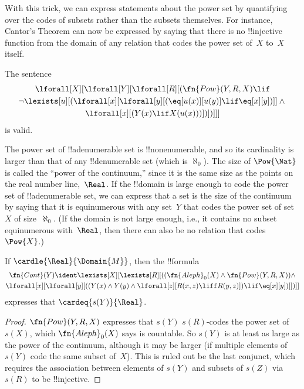 \documentclass[../../../include/open-logic-section]{subfiles}
\begin{document}
\begin{explain}
With this trick, we can express statements about the power set by
quantifying over the codes of subsets rather than the subsets
themselves.  For instance, Cantor's Theorem can now be expressed
by saying that there is no !!{injective} function from the domain
of any relation that codes the power set of~$X$ to~$X$ itself.
\end{explain}

\begin{prop}
The sentence
\begin{multline*}
  \lforall[X][\lforall[Y][\lforall[R][(\fn{Pow}(Y, R, X) \lif \\
      \lnot \lexists[u][(\lforall[x][\lforall[y][(\eq[u(x)][u(y)] \lif
            \eq[x][y])]] \land {}\\
        \lforall[x][(Y(x) \lif X(u(x)))])])]]]
\end{multline*}
is valid.
\end{prop}

\begin{explain}
The power set of !!a{denumerable} set is !!{nonenumerable}, and so its
cardinality is larger than that of any !!{denumerable} set (which is
$\aleph_0$).  The size of $\Pow{\Nat}$ is called the ``power of the
continuum,'' since it is the same size as the points on the real
number line,~$\Real$. If the !!{domain} is large enough to code the
power set of !!a{denumerable} set, we can express that a set is the
size of the continuum by saying that it is equinumerous with any
set~$Y$ that codes the power set of set~$X$ of size~$\aleph_0$. (If the
domain is not large enough, i.e., it contains no subset equinumerous
with~$\Real$, then there can also be no relation that codes~$\Pow{X}$.)
\end{explain}

\begin{prop}
If $\cardle{\Real}{\Domain{M}}$, then the !!{formula}
\begin{multline*}
\fn{Cont}(Y) \ident 
\lexists[X][\lexists[R][((\fn{Aleph}_0(X) \land
      \fn{Pow}(Y, R, X)) \land \\ 
      \lforall[x][\lforall[y][((Y(x) \land {} 
      Y(y) \land \lforall[z][R(x,z) \liff R(y,z)]) \lif \eq[x][y])]])]]
\end{multline*}
expresses that $\cardeq{s(Y)}{\Real}$.
\end{prop}

\begin{proof}
  $\fn{Pow}(Y, R, X)$ expresses that $s(Y)$ $s(R)$-codes the power set
  of~$s(X)$, which $\fn{Aleph}_0(X)$ says is countable. So $s(Y)$ is
  at least as large as the power of the continuum, although it may be
  larger (if multiple elements of $s(Y)$ code the same subset of~$X$).
  This is ruled out be the last conjunct, which requires the
  association between elements of $s(Y)$ and subsets of $s(Z)$ via
  $s(R)$ to be !!{injective}.
\end{proof}
\end{document}
